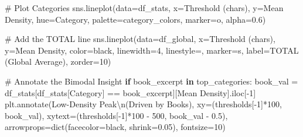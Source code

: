 \documentclass[
  italian,
  a4paper,
]{article}
\newenvironment{Shaded}{\begin{snugshade}}{\end{snugshade}}
\newcommand{\BuiltInTok}[1]{\textcolor[rgb]{0.00,0.23,0.31}{#1}}
\newcommand{\CharTok}[1]{\textcolor[rgb]{0.13,0.47,0.30}{#1}}
\newcommand{\CommentTok}[1]{\textcolor[rgb]{0.37,0.37,0.37}{#1}}
\newcommand{\ControlFlowTok}[1]{\textcolor[rgb]{0.00,0.23,0.31}{\textbf{#1}}}
\newcommand{\DecValTok}[1]{\textcolor[rgb]{0.68,0.00,0.00}{#1}}
\newcommand{\FloatTok}[1]{\textcolor[rgb]{0.68,0.00,0.00}{#1}}
\newcommand{\KeywordTok}[1]{\textcolor[rgb]{0.00,0.23,0.31}{\textbf{#1}}}
\newcommand{\NormalTok}[1]{\textcolor[rgb]{0.00,0.23,0.31}{#1}}
\newcommand{\OperatorTok}[1]{\textcolor[rgb]{0.37,0.37,0.37}{#1}}
\newcommand{\StringTok}[1]{\textcolor[rgb]{0.13,0.47,0.30}{#1}}
\begin{document}
\begin{Shaded}
\begin{Highlighting}[]
\CommentTok{\# Plot Categories}
\NormalTok{sns.lineplot(data}\OperatorTok{=}\NormalTok{df\_stats, x}\OperatorTok{=}\StringTok{\textquotesingle{}Threshold (chars)\textquotesingle{}}\NormalTok{, y}\OperatorTok{=}\StringTok{\textquotesingle{}Mean Density\textquotesingle{}}\NormalTok{, }
\NormalTok{             hue}\OperatorTok{=}\StringTok{\textquotesingle{}Category\textquotesingle{}}\NormalTok{, palette}\OperatorTok{=}\NormalTok{category\_colors, marker}\OperatorTok{=}\StringTok{\textquotesingle{}o\textquotesingle{}}\NormalTok{, alpha}\OperatorTok{=}\FloatTok{0.6}\NormalTok{)}

\CommentTok{\# Add the TOTAL line}
\NormalTok{sns.lineplot(data}\OperatorTok{=}\NormalTok{df\_global, x}\OperatorTok{=}\StringTok{\textquotesingle{}Threshold (chars)\textquotesingle{}}\NormalTok{, y}\OperatorTok{=}\StringTok{\textquotesingle{}Mean Density\textquotesingle{}}\NormalTok{, }
\NormalTok{             color}\OperatorTok{=}\StringTok{\textquotesingle{}black\textquotesingle{}}\NormalTok{, linewidth}\OperatorTok{=}\DecValTok{4}\NormalTok{, linestyle}\OperatorTok{=}\StringTok{\textquotesingle{}{-}\textquotesingle{}}\NormalTok{, marker}\OperatorTok{=}\StringTok{\textquotesingle{}s\textquotesingle{}}\NormalTok{, }
\NormalTok{             label}\OperatorTok{=}\StringTok{\textquotesingle{}TOTAL (Global Average)\textquotesingle{}}\NormalTok{, zorder}\OperatorTok{=}\DecValTok{10}\NormalTok{)}

\CommentTok{\# Annotate the Bimodal Insight}
\ControlFlowTok{if} \StringTok{\textquotesingle{}book\_excerpt\textquotesingle{}} \KeywordTok{in}\NormalTok{ top\_categories:}
\NormalTok{    book\_val }\OperatorTok{=}\NormalTok{ df\_stats[df\_stats[}\StringTok{\textquotesingle{}Category\textquotesingle{}}\NormalTok{] }\OperatorTok{==} \StringTok{\textquotesingle{}book\_excerpt\textquotesingle{}}\NormalTok{][}\StringTok{\textquotesingle{}Mean Density\textquotesingle{}}\NormalTok{].iloc[}\OperatorTok{{-}}\DecValTok{1}\NormalTok{]}
\NormalTok{    plt.annotate(}\StringTok{\textquotesingle{}Low{-}Density Peak}\CharTok{\textbackslash{}n}\StringTok{(Driven by Books)\textquotesingle{}}\NormalTok{, }
\NormalTok{                 xy}\OperatorTok{=}\NormalTok{(thresholds[}\OperatorTok{{-}}\DecValTok{1}\NormalTok{]}\OperatorTok{*}\DecValTok{100}\NormalTok{, book\_val), }
\NormalTok{                 xytext}\OperatorTok{=}\NormalTok{(thresholds[}\OperatorTok{{-}}\DecValTok{1}\NormalTok{]}\OperatorTok{*}\DecValTok{100} \OperatorTok{{-}} \DecValTok{500}\NormalTok{, book\_val }\OperatorTok{{-}} \FloatTok{0.5}\NormalTok{),}
\NormalTok{                 arrowprops}\OperatorTok{=}\BuiltInTok{dict}\NormalTok{(facecolor}\OperatorTok{=}\StringTok{\textquotesingle{}black\textquotesingle{}}\NormalTok{, shrink}\OperatorTok{=}\FloatTok{0.05}\NormalTok{), fontsize}\OperatorTok{=}\DecValTok{10}\NormalTok{)}


\end{Highlighting}
\end{Shaded}
\end{document}
